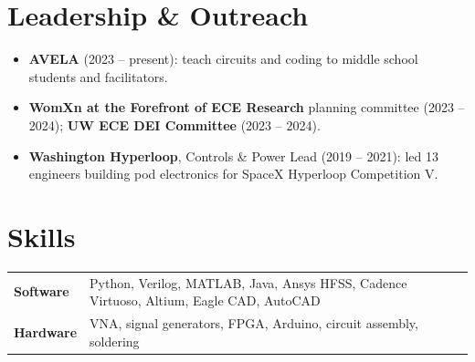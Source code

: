 \documentclass[10pt,letterpaper]{article}
\begin{document}
\section{Leadership \& Outreach}
\begin{itemize}
  \item \textbf{AVELA} (2023 -- present): teach circuits and coding to middle school students and facilitators.
  \item \textbf{WomXn at the Forefront of ECE Research} planning committee (2023 -- 2024); \textbf{UW ECE DEI Committee} (2023 -- 2024).
  \item \textbf{Washington Hyperloop}, Controls \& Power Lead (2019 -- 2021): led 13 engineers building pod electronics for SpaceX Hyperloop Competition V.
\end{itemize}

\section{Skills}
\begin{tabularx}{\linewidth}{@{}l X@{}}
  \textbf{Software} & Python, Verilog, MATLAB, Java, Ansys HFSS, Cadence Virtuoso, Altium, Eagle CAD, AutoCAD\\
  \textbf{Hardware} & VNA, signal generators, FPGA, Arduino, circuit assembly, soldering\\
\end{tabularx}
\end{document}
